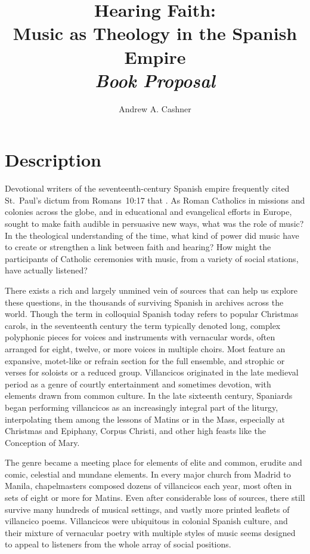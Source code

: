 \documentclass{vcbook-proposal}
\title{Hearing Faith:\\ Music as Theology in the Spanish Empire\\
\emph{Book Proposal}}
\author{Andrew A. Cashner}
\begin{document}
\maketitle

\tableofcontents
\clearpage

\section{Description}

Devotional writers of the seventeenth-century Spanish empire frequently cited 
St.~Paul's dictum from Romans~10:17 that .
As Roman Catholics in missions and colonies across the globe, and in 
educational and evangelical efforts in Europe, sought to make faith audible in 
persuasive new ways, what was the role of music?
In the theological understanding of the time, what kind of power did music have 
to create or strengthen a link between faith and hearing?
How might the participants of Catholic ceremonies with music, from a variety of 
social stations, have actually listened?

There exists a rich and largely unmined vein of sources that can help us 
explore these questions, in the thousands of surviving Spanish 
 in archives across the world.
Though the term  in colloquial Spanish today refers to popular
Christmas carols, in the seventeenth century the term typically denoted long,
complex polyphonic pieces for voices and instruments with vernacular words,
often arranged for eight, twelve, or more voices in multiple choirs.
Most feature an expansive, motet-like  or refrain section for 
the full ensemble, and strophic  or verses for soloists or a 
reduced group.
Villancicos originated in the late medieval period as a genre of courtly 
entertainment and sometimes devotion, with elements drawn from common culture.
In the late sixteenth century, Spaniards began performing villancicos as an 
increasingly integral part of the liturgy, interpolating them among the lessons 
of Matins or in the Mass, especially at Christmas and Epiphany, Corpus Christi, 
and other high feasts like the Conception of Mary.

The genre became a meeting place for elements of elite and common, erudite and 
comic, celestial and mundane elements.
In every major church from Madrid to Manila, chapelmasters composed dozens of
villancicos each year, most often in sets of eight or more for Matins.
Even after considerable loss of sources, there still survive many hundreds of 
musical settings, and vastly more printed leaflets of villancico poems. 
Villancicos were ubiquitous in colonial Spanish culture, and their mixture of 
vernacular poetry with multiple styles of music seems designed to appeal to 
listeners from the whole array of social positions.
\end{document}
